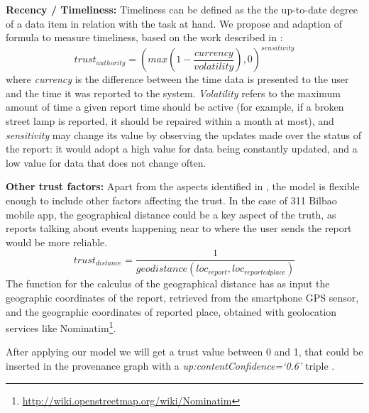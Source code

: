 \textbf{Recency / Timeliness:} Timeliness can be defined as the the up-to-date degree of a data item in relation with the task at hand. We propose and adaption of \cite{Hartig09usingweb} formula to measure timeliness, based on the work described in \cite{Ballou:1998:MIM:291329.291335}:
%
\begin{equation}
    trust_{authority} = (max(1-\frac{currency}{volatility}), 0)^{sensitivity}
\end{equation}
%
where \emph{currency} is the difference between the time data is presented to the user and the time it was reported to the system. \emph{Volatility} refers to the maximum amount of time a given report time should be active (for example, if a broken street lamp is reported, it should be repaired within a month at most), and \emph{sensitivity} may change its value by observing the updates made over the status of the report: it would adopt a high value for data being constantly updated, and a low value for data that does not change often.

\textbf{Other trust factors:} Apart from the aspects identified in \cite{gil2007towards}, the model is flexible enough to include other factors affecting the trust. In the case of 311 Bilbao mobile app, the geographical distance could be a key aspect of the truth, as reports talking about events happening near to where the user sends the report would be more reliable.
%
\begin{equation}
trust_{distance} = \frac{1}{geodistance(loc_{report}, loc_{reportedplace})}
\end{equation}
%
The function for the calculus of the geographical distance has as input the geographic coordinates of the report, retrieved from the smartphone GPS sensor, and the geographic coordinates of reported place, obtained with geolocation services like Nominatim\footnote{\url{http://wiki.openstreetmap.org/wiki/Nominatim}}.

After applying our model we will get a trust value between 0 and 1, that could be inserted in the provenance graph with a \textit{up:contentConfidence=`0.6'} triple \cite{de_nies_modeling_2013}.
